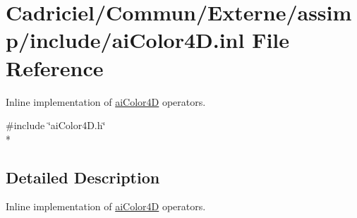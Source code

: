 \hypertarget{ai_color4_d_8inl}{\section{Cadriciel/\-Commun/\-Externe/assimp/include/ai\-Color4\-D.inl File Reference}
\label{ai_color4_d_8inl}
}


Inline implementation of \hyperlink{structai_color4_d}{ai\-Color4\-D} operators.  


{\ttfamily \#include \char`\"{}ai\-Color4\-D.\-h\char`\"{}}\\*


\subsection{Detailed Description}
Inline implementation of \hyperlink{structai_color4_d}{ai\-Color4\-D} operators. 